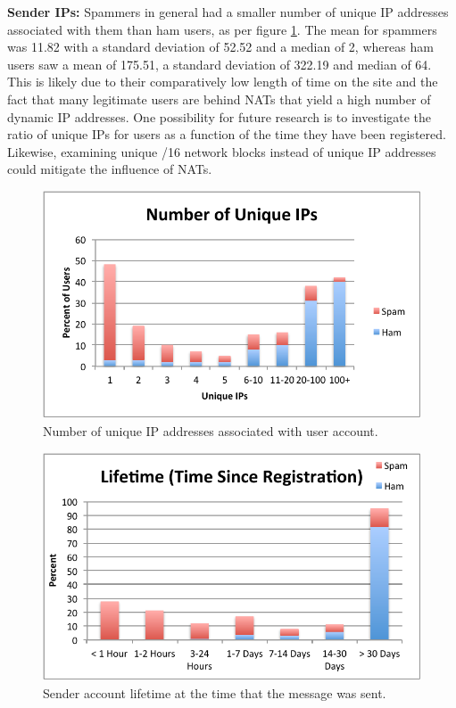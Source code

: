 \documentclass[preprint]{acm_proc_article-sp}
\begin{document}
\textbf{Sender IPs:} Spammers in general had a smaller number of unique IP addresses associated with them than ham users, as per figure \ref{fig:uniqip}. The mean for spammers was 11.82 with a standard deviation of 52.52 and a median of 2, whereas ham users saw a mean of 175.51, a standard deviation of 322.19 and median of 64. This is likely due to their comparatively low length of time on the site and the fact that many legitimate users are behind NATs that yield a high number of dynamic IP addresses. One possibility for future research is to investigate the ratio of unique IPs for users as a function of the time they have been registered. Likewise, examining unique /16 network blocks instead of unique IP addresses could mitigate the influence of NATs.

\begin{figure}[h]
    \centering
    \includegraphics[width=\linewidth]{figures/unique-ips.pdf}
    \caption{Number of unique IP addresses associated with user account.}
    \label{fig:uniqip}
\end{figure}

\begin{figure}[h]
    \centering
    \includegraphics[width=\linewidth]{figures/lifetime.pdf}
    \caption{Sender account lifetime at the time that the message was sent.}
    \label{fig:lifetime}
\end{figure}
\end{document}
